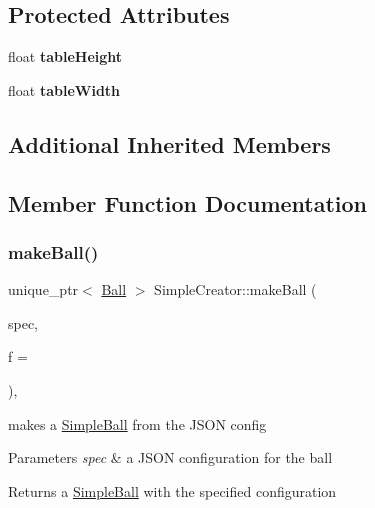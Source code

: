 \subsection*{Protected Attributes}
\begin{DoxyCompactItemize}
\item 
\mbox{\label{class_simple_creator_a7645d79be8e3c339826bb8fe585dbabb}} 
float {\bfseries table\+Height}
\item 
\mbox{\label{class_simple_creator_aac38f49aba11104b8424df0867174e0c}} 
float {\bfseries table\+Width}
\end{DoxyCompactItemize}
\subsection*{Additional Inherited Members}


\subsection{Member Function Documentation}
\mbox{\label{class_simple_creator_a8e5fdfc8bcd5a661cdcfb49d33a51910}} 
\subsubsection{\texorpdfstring{make\+Ball()}{makeBall()}}
{\footnotesize\ttfamily unique\+\_\+ptr$<$ \mbox{\hyperlink{class_ball}{Ball}} $>$ Simple\+Creator\+::make\+Ball (\begin{DoxyParamCaption}\item[{const Q\+Json\+Object \&}]{spec,  }\item[{int}]{f = {} }\end{DoxyParamCaption})\hspace{0.3cm}{\ttfamily [protected]}, {\ttfamily [virtual]}}



makes a \mbox{\hyperlink{class_simple_ball}{Simple\+Ball}} from the J\+S\+ON config 


\begin{DoxyParams}{Parameters}
{\em spec} & a J\+S\+ON configuration for the ball\\
\hline
\end{DoxyParams}
\begin{DoxyReturn}{Returns}
a \mbox{\hyperlink{class_simple_ball}{Simple\+Ball}} with the specified configuration 
\end{DoxyReturn}


